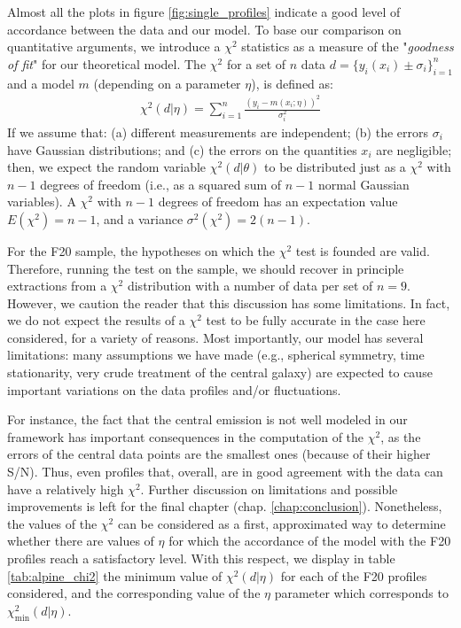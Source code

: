 Almost all the plots in figure \ref{fig:single_profiles} indicate a good level of accordance between the data and our model. To base our comparison on quantitative arguments, we introduce a $\chi^2$ statistics as a measure of the "\textit{goodness of fit}" for our theoretical model. The $\chi^2$ for a set of $n$ data $d=\{y_i(x_i)\pm\sigma_i\}_{i=1}^n$ and a model $m$ (depending on a parameter $\eta$), is defined as:
\begin{align}
    \chi^2(d | \eta ) = \sum_{i=1}^n \frac{(y_i - m(x_i;\eta))^2}{\sigma_i^2}
\end{align}
If we assume that: (a) different measurements are independent; (b) the errors $\sigma_i$ have Gaussian distributions; and (c) the errors on the quantities $x_i$ are negligible; then, we expect the random variable $\chi^2(d | \theta )$ to be distributed just as a $\chi^2$ with $n-1$ degrees of freedom (i.e., as a squared sum of $n-1$ normal Gaussian variables). A $\chi^2$ with $n-1$ degrees of freedom has an expectation value $E(\chi^2) = n-1$, and a variance $\sigma^2({\chi^2})=2(n-1)$.

For the F20 sample, the hypotheses on which the $\chi^2$ test is founded are valid. Therefore, running the test on the sample, we should recover in principle extractions from a $\chi^2$ distribution with a number of data per set of $n=9$. However, we caution the reader that this discussion has some limitations. In fact, we do not expect the results of a $\chi^2$ test to be fully accurate in the case here considered, for a variety of reasons. Most importantly, our model has several limitations: many assumptions we have made (e.g., spherical symmetry, time stationarity, very crude treatment of the central galaxy) are expected to cause important variations on the data profiles and/or fluctuations. %

For instance, the fact that the central emission is not well modeled in our framework has important consequences in the computation of the $\chi^2$, as the errors of the central data points are the smallest ones (because of their higher S/N). Thus, even profiles that, overall, are in good agreement with the data can have a relatively high $\chi^2$. Further discussion on limitations and possible improvements is left for the final chapter (chap. \ref{chap:conclusion}). Nonetheless, the values of the $\chi^2$ can be considered as a first, approximated way to determine whether there are values of $\eta$ for which the accordance of the model with the F20 profiles reach a satisfactory level. With this respect, we display in table \ref{tab:alpine_chi2} the minimum value of $\chi^2(d|\eta)$ for each of the F20 profiles considered, and the corresponding value of the $\eta$ parameter which corresponds to  $\chi^2_\mathrm{min}(d|\eta)$.


